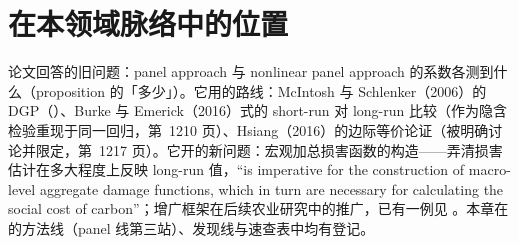 \section{在本领域脉络中的位置}

论文回答的旧问题：panel approach 与 nonlinear panel approach 的系数各测到什么（proposition 的「多少」）。它用的路线：McIntosh 与 Schlenker（2006）的 DGP（\citealp{mcintosh2006identifying}）、Burke 与 Emerick（2016）式的 short-run 对 long-run 比较（作为隐含检验重现于同一回归，第~1210 页）、Hsiang（2016）的边际等价论证（被明确讨论并限定，第~1217 页）。它开的新问题：宏观加总损害函数的构造——弄清损害估计在多大程度上反映 long-run 值，``is imperative for the construction of macro-level aggregate damage functions, which in turn are necessary for calculating the social cost of carbon''\citep[第~1235 页]{merel2021climate}；增广框架在后续农业研究中的推广，已有一例见 。本章在  的方法线（panel 线第三站）、发现线与速查表中均有登记。


\chapterrefs
